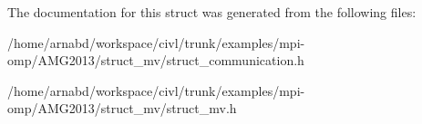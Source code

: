 The documentation for this struct was generated from the following files\+:\begin{DoxyCompactItemize}
\item 
/home/arnabd/workspace/civl/trunk/examples/mpi-\/omp/\+A\+M\+G2013/struct\+\_\+mv/struct\+\_\+communication.\+h\item 
/home/arnabd/workspace/civl/trunk/examples/mpi-\/omp/\+A\+M\+G2013/struct\+\_\+mv/struct\+\_\+mv.\+h\end{DoxyCompactItemize}
